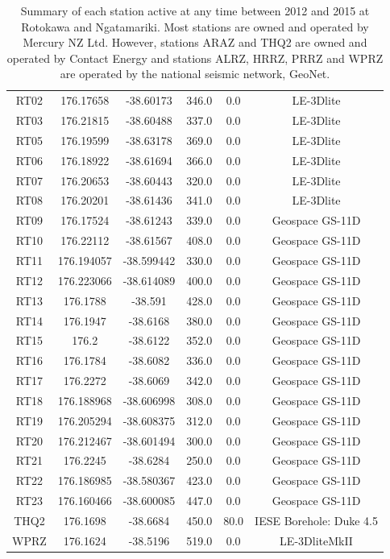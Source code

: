 \begin{table}
{\begin{tabular}{cccccc}
    RT02 & 176.17658 & -38.60173 & 346.0 & 0.0 & LE-3Dlite \\
    RT03 & 176.21815 & -38.60488 & 337.0 & 0.0 & LE-3Dlite \\
    RT05 & 176.19599 & -38.63178 & 369.0 & 0.0 & LE-3Dlite \\
    RT06 & 176.18922 & -38.61694 & 366.0 & 0.0 & LE-3Dlite \\
    RT07 & 176.20653 & -38.60443 & 320.0 & 0.0 & LE-3Dlite \\
    RT08 & 176.20201 & -38.61436 & 341.0 & 0.0 & LE-3Dlite \\
    RT09 & 176.17524 & -38.61243 & 339.0 & 0.0 & Geospace GS-11D \\
    RT10 & 176.22112 & -38.61567 & 408.0 & 0.0 & Geospace GS-11D \\
    RT11 & 176.194057 & -38.599442 & 330.0 & 0.0 & Geospace GS-11D \\
    RT12 & 176.223066 & -38.614089 & 400.0 & 0.0 & Geospace GS-11D \\
    RT13 & 176.1788 & -38.591 & 428.0 & 0.0 & Geospace GS-11D \\
    RT14 & 176.1947 & -38.6168 & 380.0 & 0.0 & Geospace GS-11D \\
    RT15 & 176.2 & -38.6122 & 352.0 & 0.0 & Geospace GS-11D \\
    RT16 & 176.1784 & -38.6082 & 336.0 & 0.0 & Geospace GS-11D \\
    RT17 & 176.2272 & -38.6069 & 342.0 & 0.0 & Geospace GS-11D \\
    RT18 & 176.188968 & -38.606998 & 308.0 & 0.0 & Geospace GS-11D \\
    RT19 & 176.205294 & -38.608375 & 312.0 & 0.0 & Geospace GS-11D \\
    RT20 & 176.212467 & -38.601494 & 300.0 & 0.0 & Geospace GS-11D \\
    RT21 & 176.2245 & -38.6284 & 250.0 & 0.0 & Geospace GS-11D \\
    RT22 & 176.186985 & -38.580367 & 423.0 & 0.0 & Geospace GS-11D \\
    RT23 & 176.160466 & -38.600085 & 447.0 & 0.0 & Geospace GS-11D \\
    THQ2 & 176.1698 & -38.6684 & 450.0 & 80.0 & IESE Borehole: Duke 4.5 \\
    WPRZ & 176.1624 & -38.5196 & 519.0 & 0.0 & LE-3DliteMkII \\
\end{tabular}}
\caption{{Summary of each station active at any time between 2012 and 2015 at Rotokawa and Ngatamariki. Most stations are owned and operated by Mercury NZ Ltd. However, stations ARAZ and THQ2 are owned and operated by Contact Energy and stations ALRZ, HRRZ, PRRZ and WPRZ are operated by the national seismic network, GeoNet.}}
\label{station_table}
\end{table}

